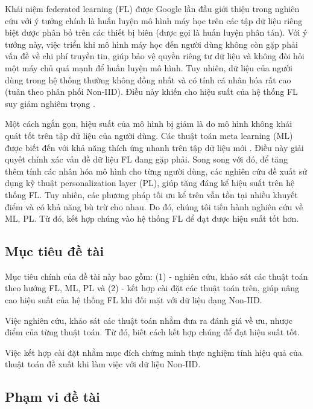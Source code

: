 Khái niệm federated learning (FL) được Google lần đầu giới thiệu trong nghiên cứu \cite{mcmahan2017communication} với ý tưởng chính là huấn luyện mô hình máy học trên các tập dữ liệu riêng biệt được phân bố trên các thiết bị biên (được gọi là huấn luyện phân tán). Với ý tưởng này, việc triển khi mô hình máy học đến người dùng không còn gặp phải vấn đề về chi phí truyền tin, giúp bảo vệ quyền riêng tư dữ liệu và không đòi hỏi một máy chủ quá mạnh để huấn luyện mô hình. Tuy nhiên, dữ liệu của người dùng trong hệ thống thường không đồng nhất và có tính cá nhân hóa rất cao (tuân theo phân phối Non-IID). Điều này khiến cho hiệu suất của hệ thống FL suy giảm nghiêm trọng \cite{zhu2021federated}.

Một cách ngắn gọn, hiệu suất của mô hình bị giảm là do mô hình không khái quát tốt trên tập dữ liệu của người dùng. Các thuật toán meta learning (ML) được biết đến với khả năng thích ứng nhanh trên tập dữ liệu mới \cite{hospedales2020meta}. Điều này giải quyết chính xác vấn đề dữ liệu FL đang gặp phải. Song song với đó, để tăng thêm tính các nhân hóa mô hình cho từng người dùng, các nghiên cứu \parencite{arivazhagan2019federated, liang2020think} đề xuất sử dụng kỹ thuật personalization layer (PL), giúp tăng đáng kể hiệu suất trên hệ thống FL. Tuy nhiên, các phương pháp tối ưu kể trên vẫn tồn tại nhiều khuyết điểm và có khả năng bù trừ cho nhau. Do đó, chúng tôi tiến hành nghiên cứu về ML, PL. Từ đó, kết hợp chúng vào hệ thống FL để đạt được hiệu suất tốt hơn.

\subsection*{Mục tiêu đề tài}

Mục tiêu chính của đề tài này bao gồm: (1) - nghiên cứu, khảo sát các thuật toán theo hướng FL, ML, PL và (2) - kết hợp cài đặt các thuật toán trên, giúp nâng cao hiệu suất của hệ thống FL khi đối mặt với dữ liệu dạng Non-IID.

Việc nghiên cứu, khảo sát các thuật toán nhằm đưa ra đánh giá về ưu, nhược điểm của từng thuật toán. Từ đó, biết cách kết hợp chúng để đạt hiệu suất tốt.

Việc kết hợp cài đặt nhằm mục đích chứng minh thực nghiệm tính hiệu quả của thuật toán đề xuất khi làm việc với dữ liệu Non-IID.

\subsection*{Phạm vi đề tài}

